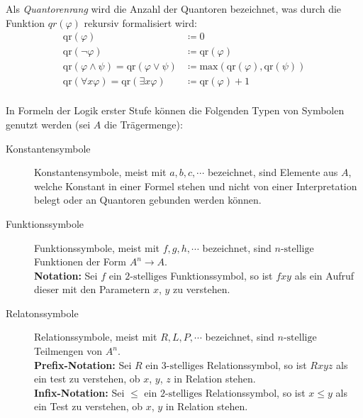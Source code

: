 \begin{description}
\begin{description}
                \end{description}
            \item[Quantorenrang] Als \textit{Quantorenrang} wird die Anzahl der Quantoren bezeichnet, was durch die Funktion $ \textit{qr}(\varphi) $ rekursiv formalisiert wird:
                \begin{align*}
                    \text{qr}(\varphi) &\coloneqq 0 \tag{$ \varphi $ atomar} \\
                    \text{qr}(\lnot \varphi) &\coloneqq \text{qr}(\varphi) \\
                    \text{qr}(\varphi \land \psi) = \text{qr}(\varphi \lor \psi) &\coloneqq \text{max}(\text{qr}(\varphi), \text{qr}(\psi)) \\
                    \text{qr}(\forall x \varphi) = \text{qr}(\exists x \varphi) &\coloneqq \text{qr}(\varphi) + 1 \\
                \end{align*}
            \item[Symbole] In Formeln der Logik erster Stufe können die Folgenden Typen von Symbolen genutzt werden (sei $ A $ die Trägermenge):
                \begin{description}
                    \item[Konstantensymbole] Konstantensymbole, meist mit $ a, b, c, \cdots $ bezeichnet, sind Elemente aus $ A $, welche Konstant in einer Formel stehen und nicht von einer Interpretation belegt oder an Quantoren gebunden werden können.
                    \item[Funktionssymbole] Funktionssymbole, meist mit $ f, g, h, \cdots $ bezeichnet, sind $ n\text{-stellige} $ Funktionen der Form $ A ^ n \rightarrow A $. \\ \textbf{Notation:} Sei $ f $ ein $ 2\text{-stelliges} $ Funktionssymbol, so ist $ fxy $ als ein Aufruf dieser mit den Parametern $ x $, $ y $ zu verstehen.
                    \item[Relatonssymbole] Relationssymbole, meist mit $ R, L, P, \cdots $ bezeichnet, sind $ n\text{-stellige} $ Teilmengen von $ A ^ n $. \\ \textbf{Prefix-Notation:} Sei $ R $ ein $ 3\text{-stelliges} $ Relationssymbol, so ist $ Rxyz $ als ein test zu verstehen, ob $ x $, $ y $, $ z $ in Relation stehen. \\ \textbf{Infix-Notation:} Sei $ \leq $ ein $ 2\text{-stelliges} $ Relationssymbol, so ist $ x \leq y $ als ein Test zu verstehen, ob $ x $, $ y $ in Relation stehen.
                \end{description}

\end{description}

